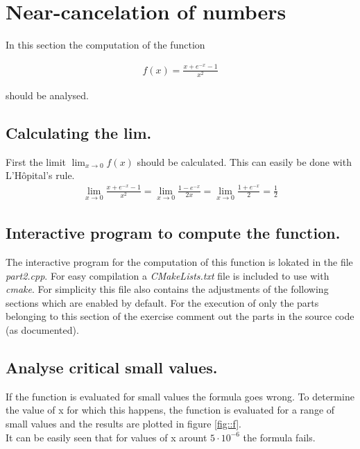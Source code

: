 \section{Near-cancelation of numbers}

In this section the computation of the function

\begin{align}
    f(x) = \frac{x+e^{-x}-1}{x^2}
\end{align}

should be analysed.

\subsection{Calculating the lim.}

First the limit $\lim_{x\to 0}f(x)$ should be calculated. This can easily be done with L'Hôpital's rule.
\begin{align}
\lim_{x\to 0}\frac{x+e^{-x}-1}{x^2} = \lim_{x\to 0} \frac{1-e^{-x}}{2x} = \lim_{x\to 0}\frac{1+e^{-x}}{2}=\frac{1}{2}   
\end{align}


\subsection{Interactive program to compute the function.}

The interactive program for the computation of this function is lokated
in the file \textit{part2.cpp}. For easy compilation
a \textit{CMakeLists.txt} file is included to use with \textit{cmake}.
For simplicity this file also contains the adjustments of
the following sections which are enabled by default. 
For the execution of only the parts belonging to this section of the exercise
comment out the parts in the source code (as documented).


\subsection{Analyse critical small values.}

If the function is evaluated for small values the formula goes wrong.
To determine the value of x for which this happens, the function
is evaluated for a range of small values and the results are plotted
in figure \ref{fig::f}.\\
It can be easily seen that for values of x arount $5\cdot 10^{-6}$ the formula
fails.

